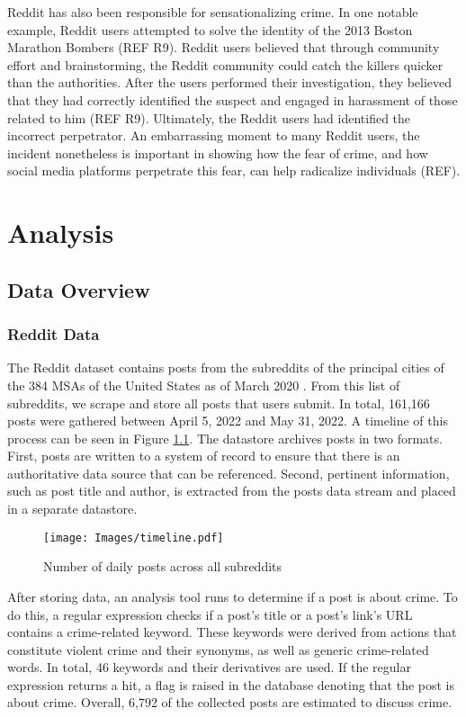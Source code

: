 \documentclass[12pt,oneside, letterpaper]{book}
\begin{document}
\par Reddit has also been responsible for sensationalizing crime. In one notable example, Reddit users attempted to solve the identity of the 2013 Boston Marathon Bombers (REF R9). Reddit users believed that through community effort and brainstorming, the Reddit community could catch the killers quicker than the authorities. After the users performed their investigation, they believed that they had correctly identified the suspect and engaged in harassment of those related to him (REF R9). Ultimately, the Reddit users had identified the incorrect perpetrator. An embarrassing moment to many Reddit users, the incident nonetheless is important in showing how the fear of crime, and how social media platforms perpetrate this fear, can help radicalize individuals (REF).

\chapter{Analysis}

\section{Data Overview}

\subsection{Reddit Data}
\par The Reddit dataset contains posts from the subreddits of the principal cities of the 384 MSAs of the United States as of March 2020 \cite{censusmetro}. From this list of subreddits, we scrape and store all posts that users submit. In total, 161,166 posts were gathered between April 5, 2022 and May 31, 2022. A timeline of this process can be seen in Figure \ref{fig:line-1}. The datastore archives posts in two formats. First, posts are written to a system of record to ensure that there is an authoritative data source that can be referenced. Second, pertinent information, such as post title and author, is extracted from the posts data stream and placed in a separate datastore.

\begin{figure}[ht]
    \centering
    \texttt{[image: Images/timeline.pdf]}
    \caption{Number of daily posts across all subreddits}
    \label{fig:line-1}
\end{figure}

\par After storing data, an analysis tool runs to determine if a post is about crime. To do this, a regular expression checks if a post's title or a post's link's URL contains a crime-related keyword. These keywords were derived from actions that constitute violent crime and their synonyms, as well as generic crime-related words. In total, 46 keywords and their derivatives are used. If the regular expression returns a hit, a flag is raised in the database denoting that the post is about crime. Overall, 6,792 of the collected posts are estimated to discuss crime.
\end{document}
